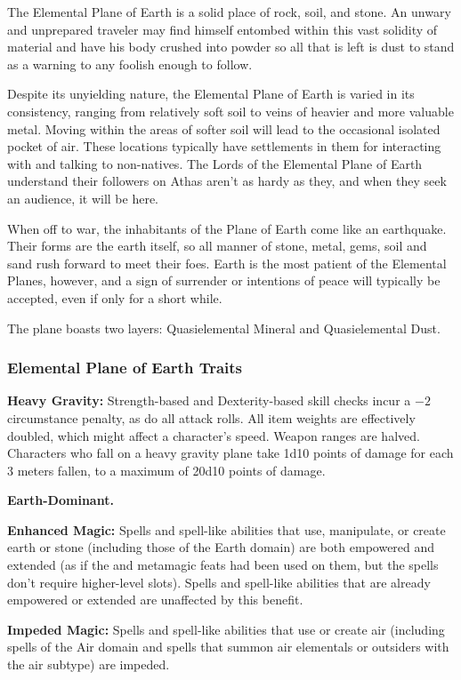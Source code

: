 The Elemental Plane of Earth is a solid place of rock, soil, and stone. An unwary and unprepared traveler may find himself entombed within this vast solidity of material and have his body crushed into powder so all that is left is dust to stand as a warning to any foolish enough to follow.

Despite its unyielding nature, the Elemental Plane of Earth is varied in its consistency, ranging from relatively soft soil to veins of heavier and more valuable metal. Moving within the areas of softer soil will lead to the occasional isolated pocket of air. These locations typically have settlements in them for interacting with and talking to non-natives. The Lords of the Elemental Plane of Earth understand their followers on Athas aren't as hardy as they, and when they seek an audience, it will be here.

When off to war, the inhabitants of the Plane of Earth come like an earthquake. Their forms are the earth itself, so all manner of stone, metal, gems, soil and sand rush forward to meet their foes. Earth is the most patient of the Elemental Planes, however, and a sign of surrender or intentions of peace will typically be accepted, even if only for a short while.

The plane boasts two layers: Quasielemental Mineral and Quasielemental Dust.


\subsubsection{Elemental Plane of Earth Traits}
\begin{itemize*}
\item \textbf{Heavy Gravity:} Strength-based and Dexterity-based skill checks incur a $-2$ circumstance penalty, as do all attack rolls. All item weights are effectively doubled, which might affect a character's speed. Weapon ranges are halved. Characters who fall on a heavy gravity plane take 1d10 points of damage for each 3 meters fallen, to a maximum of 20d10 points of damage.
\item \textbf{Earth-Dominant.}
\item \textbf{Enhanced Magic:} Spells and spell-like abilities that use, manipulate, or create earth or stone (including those of the Earth domain) are both empowered and extended (as if the  and  metamagic feats had been used on them, but the spells don't require higher-level slots). Spells and spell-like abilities that are already empowered or extended are unaffected by this benefit.
\item \textbf{Impeded Magic:} Spells and spell-like abilities that use or create air (including spells of the Air domain and spells that summon air elementals or outsiders with the air subtype) are impeded.
\end{itemize*}


